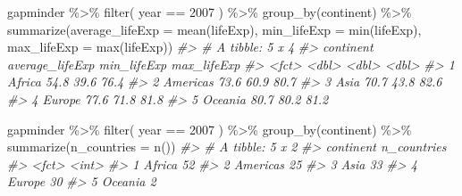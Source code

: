 \documentclass[
]{book}
\newenvironment{Shaded}{\begin{snugshade}}{\end{snugshade}}
\newcommand{\AttributeTok}[1]{\textcolor[rgb]{0.77,0.63,0.00}{#1}}
\newcommand{\CommentTok}[1]{\textcolor[rgb]{0.56,0.35,0.01}{\textit{#1}}}
\newcommand{\DecValTok}[1]{\textcolor[rgb]{0.00,0.00,0.81}{#1}}
\newcommand{\FunctionTok}[1]{\textcolor[rgb]{0.00,0.00,0.00}{#1}}
\newcommand{\NormalTok}[1]{#1}
\newcommand{\SpecialCharTok}[1]{\textcolor[rgb]{0.00,0.00,0.00}{#1}}
\begin{document}
\begin{Shaded}
\begin{Highlighting}[]
\NormalTok{gapminder }\SpecialCharTok{\%\textgreater{}\%} 
  \FunctionTok{filter}\NormalTok{( year }\SpecialCharTok{==} \DecValTok{2007}\NormalTok{ ) }\SpecialCharTok{\%\textgreater{}\%}
  \FunctionTok{group\_by}\NormalTok{(continent) }\SpecialCharTok{\%\textgreater{}\%} 
  \FunctionTok{summarize}\NormalTok{(}\AttributeTok{average\_lifeExp =} \FunctionTok{mean}\NormalTok{(lifeExp),}
            \AttributeTok{min\_lifeExp =} \FunctionTok{min}\NormalTok{(lifeExp),}
            \AttributeTok{max\_lifeExp =} \FunctionTok{max}\NormalTok{(lifeExp))}
\CommentTok{\#\textgreater{} \# A tibble: 5 x 4}
\CommentTok{\#\textgreater{}   continent average\_lifeExp min\_lifeExp max\_lifeExp}
\CommentTok{\#\textgreater{}   \textless{}fct\textgreater{}               \textless{}dbl\textgreater{}       \textless{}dbl\textgreater{}       \textless{}dbl\textgreater{}}
\CommentTok{\#\textgreater{} 1 Africa               54.8        39.6        76.4}
\CommentTok{\#\textgreater{} 2 Americas             73.6        60.9        80.7}
\CommentTok{\#\textgreater{} 3 Asia                 70.7        43.8        82.6}
\CommentTok{\#\textgreater{} 4 Europe               77.6        71.8        81.8}
\CommentTok{\#\textgreater{} 5 Oceania              80.7        80.2        81.2}
\end{Highlighting}
\end{Shaded}

\begin{Shaded}
\begin{Highlighting}[]
\NormalTok{gapminder }\SpecialCharTok{\%\textgreater{}\%} 
  \FunctionTok{filter}\NormalTok{( year }\SpecialCharTok{==} \DecValTok{2007}\NormalTok{ ) }\SpecialCharTok{\%\textgreater{}\%}
  \FunctionTok{group\_by}\NormalTok{(continent) }\SpecialCharTok{\%\textgreater{}\%} 
  \FunctionTok{summarize}\NormalTok{(}\AttributeTok{n\_countries =} \FunctionTok{n}\NormalTok{()) }
\CommentTok{\#\textgreater{} \# A tibble: 5 x 2}
\CommentTok{\#\textgreater{}   continent n\_countries}
\CommentTok{\#\textgreater{}   \textless{}fct\textgreater{}           \textless{}int\textgreater{}}
\CommentTok{\#\textgreater{} 1 Africa             52}
\CommentTok{\#\textgreater{} 2 Americas           25}
\CommentTok{\#\textgreater{} 3 Asia               33}
\CommentTok{\#\textgreater{} 4 Europe             30}
\CommentTok{\#\textgreater{} 5 Oceania             2}
\end{Highlighting}
\end{Shaded}
\end{document}
